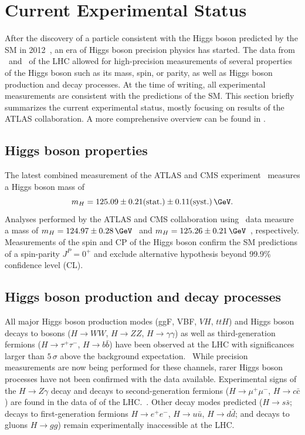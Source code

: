 \section{Current Experimental Status}
\label{subsec:higgs-exp-status}
After the discovery of a particle consistent with the Higgs boson predicted by the SM in 2012~\cite{HIGG-2012-27,CMS-HIG-12-028}, an era of Higgs boson precision physics has started.
The data from \RunOne\ and \RunTwo\ of the LHC allowed for high-precision measurements of several properties of the Higgs boson such as its mass, spin, or parity, as well as Higgs boson production and decay processes. 
At the time of writing, all experimental measurements are consistent with the predictions of the SM.
This section briefly summarizes the current experimental status, mostly focusing on results of the ATLAS collaboration. A more comprehensive overview can be found in . 

\subsection{Higgs boson properties}
The latest combined measurement of the ATLAS and CMS experiment~\cite{HIGG-2014-14} measures a Higgs boson mass of 
\begin{equation}
  m_H = 125.09 \pm 0.21\text{(stat.)} \pm 0.11\text{(syst.)}\,\GeV.
\end{equation}
Analyses performed by the ATLAS and CMS collaboration using \RunTwo\ data measure a mass of $m_H = 124.97\pm0.28\,\GeV$~\cite{ATLAS-CONF-2017-046} and $m_H = 125.26 \pm 0.21\,\GeV$~\cite{Sirunyan_2020}, respectively.
Measurements of the spin and CP of the Higgs boson confirm the SM predictions of a spin-parity $J^P = 0^+$ and exclude alternative hypothesis beyond 99.9\% confidence level (CL).~\cite{HIGG-2013-17-witherratum,CMS-HIG-14-018} 

\subsection{Higgs boson production and decay processes}
All major Higgs boson production modes (ggF, VBF, $VH$, $ttH$) and Higgs boson decays to bosons ($H \to WW$, $H \to ZZ$, $H \to \gamma\gamma$) as well as third-generation fermions ($H \to \tau^+\tau^-$, $H \to b\bar{b}$) have been observed at the LHC with significances larger than $5\,\sigma$ above the background expectation.~\cite{NaturePaper}
While precision measurements are now being performed for these channels, rarer Higgs boson processes have not been confirmed with the data available. 
Experimental signs of the $H \to Z\gamma$ decay and decays to second-generation fermions ($H \to \mu^+\mu^-$, $H \to c\bar{c}$) are found in the data of \RunTwo of the LHC.~\cite{HIGG-2018-42,HIGG-2019-14,ATLAS-CONF-2021-021}.
Other decay modes predicted ($H \to s\bar{s}$; decays to first-generation fermions $H \to e^+e^-$, $H \to u\bar{u}$, $H \to d\bar{d}$; and decays to gluons $H \to gg$) remain experimentally inaccessible at the LHC. 

